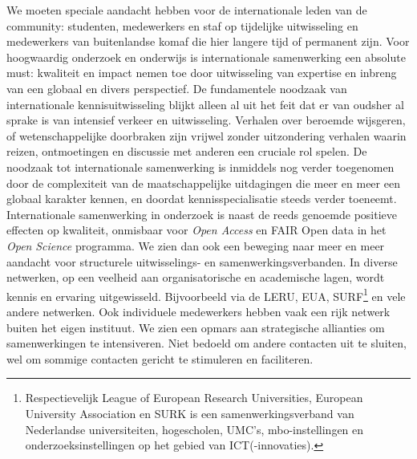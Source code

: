 \documentclass[smallauthor, chapterhaspagenum, nochapterinheader, pagenuminheader,  bigchapnum,medium2, tocpages, garamond, titleinheader]{jote-book}
\begin{document}
	We moeten speciale aandacht hebben voor de internationale leden van de community: studenten, medewerkers en staf op tijdelijke uitwisseling en medewerkers van buitenlandse komaf die hier langere tijd of permanent zijn. Voor hoogwaardig onderzoek en onderwijs is internationale samenwerking een absolute must: kwaliteit en impact nemen toe door uitwisseling van expertise en inbreng van een globaal en divers perspectief. De fundamentele noodzaak van internationale kennisuitwisseling blijkt alleen al uit het feit dat er van oudsher al sprake is van intensief verkeer en uitwisseling. Verhalen over beroemde wijsgeren, of wetenschappelijke doorbraken zijn vrijwel zonder uitzondering verhalen waarin reizen, ontmoetingen en discussie met anderen een cruciale rol spelen. De noodzaak tot internationale samenwerking is inmiddels nog verder toegenomen door de complexiteit van de maatschappelijke uitdagingen die meer en meer een globaal karakter kennen, en doordat kennisspecialisatie steeds verder toeneemt. Internationale samenwerking in onderzoek is naast de reeds genoemde positieve effecten op kwaliteit, onmisbaar voor \emph{Open Access} en FAIR Open data in het \emph{Open }\emph{Science} programma. We zien dan ook een beweging naar meer en meer aandacht voor structurele uitwisselings- en samenwerkingsverbanden. In diverse netwerken, op een veelheid aan organisatorische en academische lagen, wordt kennis en ervaring uitgewisseld. Bijvoorbeeld via de LERU, EUA, SURF\footnote{Respectievelijk League of European Research Universities, European University Association en SURK is een samenwerkingsverband van Nederlandse universiteiten, hogescholen, UMC's, mbo-instellingen en onderzoeksinstellingen op het gebied van ICT(-innovaties).} en vele andere netwerken. Ook individuele medewerkers hebben vaak een rijk netwerk buiten het eigen instituut. We zien een opmars aan strategische allianties om samenwerkingen te intensiveren. Niet bedoeld om andere contacten uit te sluiten, wel om sommige contacten gericht te stimuleren en faciliteren.
\end{document}
